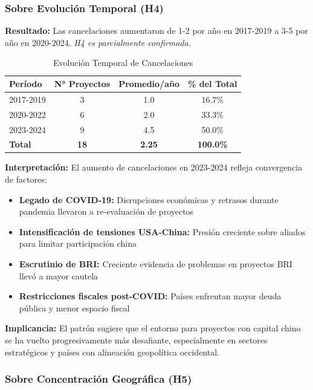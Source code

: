 \documentclass[12pt]{article}
\begin{document}
\subsubsection{Sobre Evolución Temporal (H4)}

\textbf{Resultado:} Las cancelaciones aumentaron de 1-2 por año en 2017-2019 a 3-5 por año en 2020-2024. \textit{H4 es parcialmente confirmada.}

\begin{table}[H]
\centering
\caption{Evolución Temporal de Cancelaciones}
\label{tab:temporal}
\begin{tabular}{lccc}
\toprule
\textbf{Período} & \textbf{N° Proyectos} & \textbf{Promedio/año} & \textbf{\% del Total} \\
\midrule
2017-2019 & 3 & 1.0 & 16.7\% \\
2020-2022 & 6 & 2.0 & 33.3\% \\
2023-2024 & 9 & 4.5 & 50.0\% \\
\midrule
\textbf{Total} & \textbf{18} & \textbf{2.25} & \textbf{100.0\%} \\
\bottomrule
\end{tabular}
\end{table}

\textbf{Interpretación:} El aumento de cancelaciones en 2023-2024 refleja convergencia de factores:

\begin{itemize}
    \item \textbf{Legado de COVID-19:} Disrupciones económicas y retrasos durante pandemia llevaron a re-evaluación de proyectos
    \item \textbf{Intensificación de tensiones USA-China:} Presión creciente sobre aliados para limitar participación china
    \item \textbf{Escrutinio de BRI:} Creciente evidencia de problemas en proyectos BRI llevó a mayor cautela
    \item \textbf{Restricciones fiscales post-COVID:} Países enfrentan mayor deuda pública y menor espacio fiscal
\end{itemize}

\textbf{Implicancia:} El patrón sugiere que el entorno para proyectos con capital chino se ha vuelto progresivamente más desafiante, especialmente en sectores estratégicos y países con alineación geopolítica occidental.

\subsubsection{Sobre Concentración Geográfica (H5)}
\end{document}
